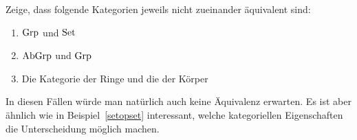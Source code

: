 \begin{aufg}Zeige, dass folgende
Kategorien jeweils nicht zueinander äquivalent sind:
\begin{enumerate}
\item $\mathrm{Grp}$ und $\mathrm{Set}$
\item $\mathrm{AbGrp}$ und $\mathrm{Grp}$
\item Die Kategorie der Ringe und die der Körper
\end{enumerate}
In diesen Fällen würde man natürlich auch keine Äquivalenz erwarten. Es ist
aber ähnlich wie in Beispiel~\ref{setopset} interessant, welche kategoriellen
Eigenschaften die Unterscheidung möglich machen.
\end{aufg}


%
%
